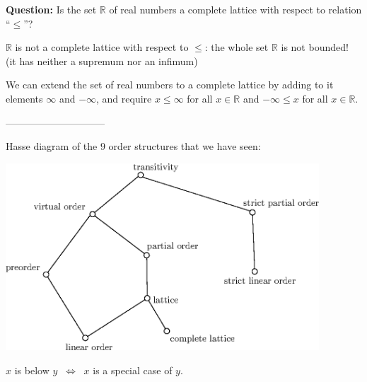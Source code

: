 \documentclass[11pt,paper=b5,footinclude,headinclude]{scrbook} %
\def\cee {{~\Leftrightarrow~}}
\theoremstyle{remark}
\theoremstyle{definition} %
\theoremstyle{theorem} %
\begin{document}
\bigskip

\textbf{ Question:} Is the set ${\mathbb R}$ of real numbers a complete lattice with respect to relation ``$\le$''?

\bigskip

$\mathbb{R}$ is not a complete lattice with respect to $\le$:
the whole set $\mathbb{R}$ is not bounded! (it has neither a supremum nor an infimum)

We can extend the set of real numbers to a complete lattice by adding to it elements
$\infty$ and $-\infty$, and require $x\le \infty$ for all $x\in \mathbb R$ and $-\infty\le x$ for all $x\in \mathbb R$.


------------------------------

Hasse diagram of the $9$ order structures that we have seen:

\begin{center}
\includegraphics[height=70mm]{strukture2-en.eps}
\end{center}

$x$ is below  $y$ $\cee$ $x$ is a special case of $y$.

%
%
%
%
%
%
%
%
\end{document}
